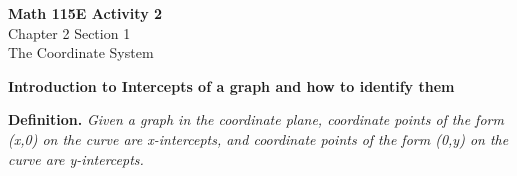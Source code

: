 \documentclass{article}
\begin{document}
\begin{center}
    \Large \textbf{Math 115E Activity 2} \\
    \vspace{0.2cm}
    \normalsize Chapter 2 Section 1 \\
    \normalsize The Coordinate System
\end{center}
\vspace{1cm} %

\textbf{Introduction to Intercepts of a graph and how to identify them}

\begin{tcolorbox}[
    width=\linewidth,
    colframe=black,         %
    colback=white,          %
    boxrule=0.5pt,          %
    left=1mm, right=1mm,    %
    top=1mm, bottom=1mm,    %
    arc=2mm                 %
]
\textbf{Definition.} \textit{Given a graph in the coordinate plane, coordinate points of the form (x,0) on the curve are x-intercepts, and coordinate points of the form (0,y) on the curve are y-intercepts.}
\end{tcolorbox}
\end{document}
